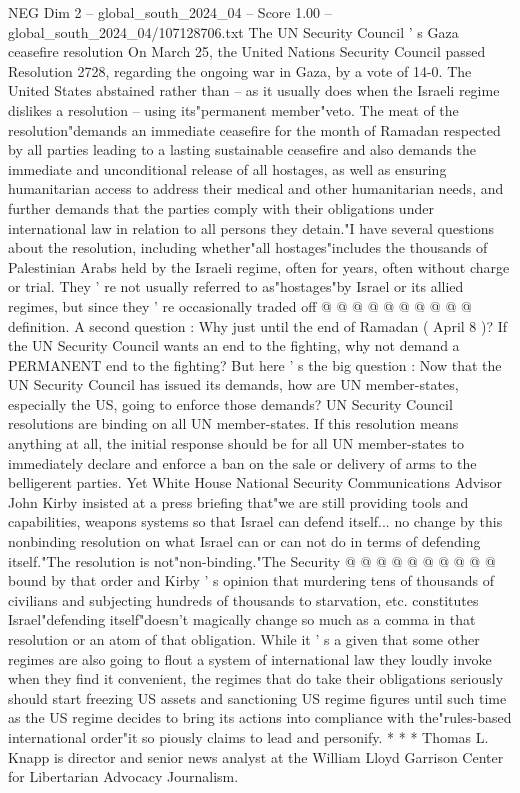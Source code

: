 \begin{textsample}{NEG Dim 2 – global\_south\_2024\_04 – Score 1.00 – global\_south\_2024\_04/107128706.txt}  \label{ex:f2_neg_396}
The UN Security Council ' s Gaza ceasefire resolution On March 25, the United Nations Security Council passed Resolution 2728, regarding the ongoing war in Gaza, by a vote of 14-0.
The United States abstained rather than -- as it usually does when the Israeli regime dislikes a resolution -- using its"permanent member"veto.
The meat of the resolution"demands an immediate ceasefire for the month of Ramadan respected by all parties leading to a lasting sustainable ceasefire and also demands the immediate and unconditional release of all hostages, as well as ensuring humanitarian access to address their medical and other humanitarian needs, and further demands that the parties comply with their obligations under international law in relation to all persons they detain."I have several questions about the resolution, including whether"all hostages"includes the thousands of Palestinian Arabs held by the Israeli regime, often for years, often without charge or trial.
They ' re not usually referred to as"hostages"by Israel or its allied regimes, but since they ' re occasionally traded off @ @ @ @ @ @ @ @ @ @ definition.
A second question : Why just until the end of Ramadan ( April 8 )?
If the UN Security Council wants an end to the fighting, why not demand a PERMANENT end to the fighting?
But here ' s the big question : Now that the UN Security Council has issued its demands, how are UN member-states, especially the US, going to enforce those demands?
UN Security Council resolutions are binding on all UN member-states.
If this resolution means anything at all, the initial response should be for all UN member-states to immediately declare and enforce a ban on the sale or delivery of arms to the belligerent parties.
Yet White House National Security Communications Advisor John Kirby insisted at a press briefing that"we are still providing tools and capabilities, weapons systems so that Israel can defend itself... no change by this nonbinding resolution on what Israel can or can not do in terms of defending itself."The resolution is not"non-binding."The Security @ @ @ @ @ @ @ @ @ @ bound by that order and Kirby ' s opinion that murdering tens of thousands of civilians and subjecting hundreds of thousands to starvation, etc. constitutes Israel"defending itself"doesn't magically change so much as a comma in that resolution or an atom of that obligation.
While it ' s a given that some other regimes are also going to flout a system of international law they loudly invoke when they find it convenient, the regimes that do take their obligations seriously should start freezing US assets and sanctioning US regime figures until such time as the US regime decides to bring its actions into compliance with the"rules-based international order"it so piously claims to lead and personify. * * * Thomas L.
Knapp is director and senior news analyst at the William Lloyd Garrison Center for Libertarian Advocacy Journalism.

\end{textsample}
